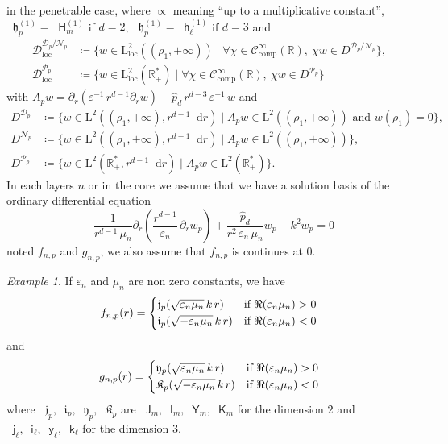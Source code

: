 \documentclass[12pt,a4paper]{article}
\theoremstyle{definition}
\theoremstyle{plain}
\theoremstyle{remark}
\newtheorem{example}[definition]{Example}
\newcommand{\bbR}{\mathbb{R}}
\newcommand{\calD}{\mathcal{D}}
\newcommand{\calN}{\mathcal{N}}
\newcommand{\calP}{\mathcal{P}}
\newcommand{\scrC}{\mathscr{C}}
\newcommand{\rmL}{\mathrm{L}}
\newcommand{\bJ}{\mathop{}\!\mathsf{J}}
\newcommand{\bY}{\mathop{}\!\mathsf{Y}}
\newcommand{\Hu}{\mathop{}\!\mathsf{H}^{(1)}}
\newcommand{\bI}{\mathop{}\!\mathsf{I}}
\newcommand{\bK}{\mathop{}\!\mathsf{K}}
\newcommand{\bj}{\mathop{}\!\mathsf{j}}
\newcommand{\by}{\mathop{}\!\mathsf{y}}
\newcommand{\hu}{\mathop{}\!\mathsf{h}^{(1)}}
\newcommand{\bi}{\mathop{}\!\mathsf{i}}
\newcommand{\bk}{\mathop{}\!\mathsf{k}}
\newcommand{\frj}{\mathop{}\!\mathfrak{j}}
\newcommand{\fry}{\mathop{}\!\mathfrak{y}}
\newcommand{\frh}{\mathop{}\!\mathfrak{h}^{(1)}}
\newcommand{\fri}{\mathop{}\!\mathfrak{i}}
\newcommand{\frk}{\mathop{}\!\mathfrak{K}}
\newcommand{\di}[1]{\mathop{}\!\mathrm{d}#1}
\newcommand{\plr}[1]{\left(#1\right)}
\newcommand{\eps}{\varepsilon}
\newcommand{\comp}{\mathrm{comp}}
\newcommand{\loc}{\mathrm{loc}}
\begin{document}
in the penetrable case, where \(\propto\) meaning ``up to a multiplicative constant'', \(\frh_p = \Hu_m\) if \(d = 2\), \(\frh_p = \hu_\ell\) if \(d = 3\) and
\begin{align*}
    \calD^{\calD_p/\calN_p}_\loc & \coloneqq \{w \in \rmL_\loc^2((\rho_1, +\infty)) \mid \forall \chi \in \scrC_\comp^\infty(\bbR),\ \chi w \in D^{\calD_p/\calN_p}\}, \\
    \calD^{\calP_p}_\loc         & \coloneqq \{w \in \rmL_\loc^2(\bbR_+^*) \mid \forall \chi \in \scrC_\comp^\infty(\bbR),\ \chi w \in D^{\calP_p}\}
\end{align*}
with \(A_p w =  \partial_r(\eps^{-1}\, r^{d-1} \partial_r w) - \widehat{p}_d\, r^{d-3}\, \eps^{-1}\, w\) and
\begin{align*}
    D^{\calD_p} & \coloneqq \{w \in \rmL^2((\rho_1, +\infty), r^{d-1}\di{r}) \mid A_p w \in \rmL^2((\rho_1, +\infty)) \text{ and } w(\rho_1) = 0\}, \\
    D^{\calN_p} & \coloneqq \{w \in \rmL^2((\rho_1, +\infty), r^{d-1}\di{r}) \mid A_p w \in \rmL^2((\rho_1, +\infty))\},                            \\
    D^{\calP_p} & \coloneqq \{w \in \rmL^2(\bbR_+^*, r^{d-1}\di{r}) \mid A_p w  \in \rmL^2(\bbR_+^*)\}.
\end{align*}
In each layers \(n\) or in the core we assume that we have a solution basis of the ordinary differential equation
\[
    -\frac{1}{r^{d-1}\, \mu_n} \partial_r\plr{\frac{r^{d-1}}{\eps_n}\, \partial_r w_p} + \dfrac{\widehat{p}_d}{r^2\, \eps_n\, \mu_n} w_p - k^2 w_p = 0
\]
noted \(f_{n, p}\) and \(g_{n, p}\), we also assume that \(f_{n, p}\) is continues at \(0\).

\begin{example}
    If \(\eps_n\) and \(\mu_n\) are non zero constants, we have
    \[
        f_{n, p}(r) = \begin{dcases}
            \frj_p(\sqrt{\eps_n\mu_n}\, k\, r)  & \text{if } \Re(\eps_n\mu_n) > 0 \\
            \fri_p(\sqrt{-\eps_n\mu_n}\, k\, r) & \text{if } \Re(\eps_n\mu_n) < 0
        \end{dcases}
    \]
    and
    \[
        g_{n, p}(r) = \begin{dcases}
            \fry_p(\sqrt{\eps_n\mu_n}\, k\, r)  & \text{if } \Re(\eps_n\mu_n) > 0 \\
            \frk_p(\sqrt{-\eps_n\mu_n}\, k\, r) & \text{if } \Re(\eps_n\mu_n) < 0
        \end{dcases}
    \]
    where \(\frj_p, \fri_p, \fry_p, \frk_p\) are \(\bJ_m, \bI_m, \bY_m, \bK_m\) for the dimension \(2\) and \(\bj_\ell, \bi_\ell, \by_\ell, \bk_\ell\) for the dimension \(3\).
\end{example}
\end{document}
